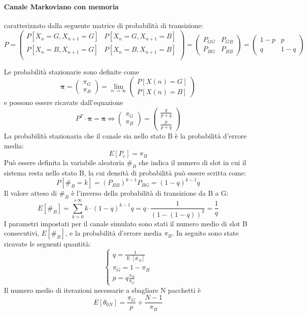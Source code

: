 \documentclass[italian, a4paper, 12pt]{article}
\newcommand{\E}[1]{\operatorname{E}\left[#1\right]}
\newcommand{\EnB}{\E{\#_B}}
\begin{document}
\paragraph{Canale Markoviano con memoria} caratterizzato dalla seguente matrice di probabilità di transizione:\\
$$P=\begin{pmatrix}
P[X_n=G, X_{n+1}=G] & P[X_n=G, X_{n+1}=B]\\
P[X_n=B, X_{n+1}=G] & P[X_n=B, X_{n+1}=B]\\
\end{pmatrix} = \begin{pmatrix}
P_{GG} & P_{GB} \\
P_{BG} & P_{BB}
\end{pmatrix} =
\begin{pmatrix}
1-p & p \\
q & 1-q
\end{pmatrix}$$

Le probabilità stazionarie sono definite come
$$\bm{\pi} = \begin{pmatrix}
\pi_G\\\pi_B
\end{pmatrix} = \lim_{n \to\infty} \begin{pmatrix}
P[X(n)=G]\\
P[X(n)=B]
\end{pmatrix}$$
e possono essere ricavate dall'equazione
$$P^T\cdot \bm{\pi} = \bm{\pi} \Leftrightarrow \begin{pmatrix}
\pi_G\\
\pi_B
\end{pmatrix}=
\begin{pmatrix}
\frac{q}{p+q}\\
\frac{p}{p+q}
\end{pmatrix}$$
La probabilità stazionaria che il canale sia nello stato B è la probabilità d'errore media:
$$E[P_e] = \pi_B$$
Può essere definita la variabile aleatoria $\#_B$ che indica il numero di slot in cui il sistema resta nello stato B, la cui densità di probabilità può essere scritta come:
$$P[\#_B=k]= \left(P_{BB}\right)^{k-1}P_{BG} = (1-q)^{k-1} q$$
Il valore atteso di $\#_B$ è l'inverso della probabilità di transizione da B a G:
$$E[\#_B] = \sum_{k=0}^{+\infty} k \cdot (1-q)^{k-1} q = q \cdot \frac{1}{(1-(1-q))^2} = \frac{1}{q}$$
I parametri impostati per il canale simulato sono stati il numero medio di slot B consecutivi, $E[\#_B]$, e la probabilità d'errore media $\pi_B$. In seguito sono state ricavate le seguenti quantità:
\begin{equation}
  \begin{cases}q = \frac{1}{\EnB}\\
\pi_G = 1- \pi_B\\
p = q\frac{\pi_B}{\pi_G}\end{cases}
  \label{eq:mcparams}
\end{equation}
Il numero medio di iterazioni necessarie a sbagliare N pacchetti è
\begin{equation}
\label{avg_errors}
E[\theta_{0N}] = \frac{\pi_G}{p} + \frac{N-1}{\pi_B}
\end{equation}
\end{document}
